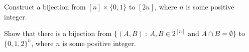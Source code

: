 \documentclass[addpoints]{exam}
\begin{document}
  \pagestyle{headandfoot}
  \runningheadrule

  \firstpagefooter{}{}{}
  \runningfooter{}{}{}
  \begin{flushright}

    \vspace{0.2in}
  \end{flushright}

  \begin{questions}
    \question[10]
      Construct a bijection from $[n] \times \{0, 1\}$ to $[2n]$, where $n$ is some
			positive integer.

      \begin{solution}[\stretch{1}]
      \end{solution}
      \newpage
    \question[10]
      Show that there is a bijection from
			$\{(A, B) ~:~ A, B \in 2^{[n]} \text{ and } A \cap B = \emptyset \}$ to
			$\{0, 1, 2\}^n$, where $n$ is some positive integer.

      \begin{solution}[\stretch{1}]
      \end{solution}
      \newpage
  \end{questions}
\end{document}
